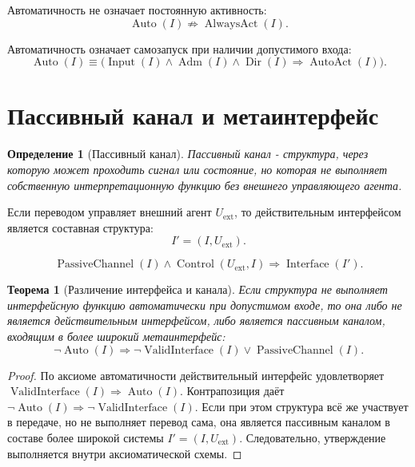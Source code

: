 \documentclass[12pt,a4paper]{article}
\newtheorem{definition}{Определение}
\newtheorem{theorem}{Теорема}
\DeclareMathOperator{\Valid}{ValidInterface}
\DeclareMathOperator{\Interface}{Interface}
\DeclareMathOperator{\Auto}{Auto}
\DeclareMathOperator{\AlwaysAct}{AlwaysAct}
\DeclareMathOperator{\Input}{Input}
\DeclareMathOperator{\Adm}{Adm}
\DeclareMathOperator{\Dir}{Dir}
\DeclareMathOperator{\AutoAct}{AutoAct}
\DeclareMathOperator{\PassiveChannel}{PassiveChannel}
\DeclareMathOperator{\Control}{Control}
\begin{document}
Автоматичность не означает постоянную активность:
\begin{equation}
\boxed{\Auto(I)\not\Rightarrow\AlwaysAct(I).}
\end{equation}

Автоматичность означает самозапуск при наличии допустимого входа:
\begin{equation}
\boxed{\Auto(I)\equiv\bigl(\Input(I)\land\Adm(I)\land\Dir(I)\Rightarrow\AutoAct(I)\bigr).}
\end{equation}

\section{Пассивный канал и метаинтерфейс}
\begin{definition}[Пассивный канал]
Пассивный канал - структура, через которую может проходить сигнал или состояние, но которая не выполняет собственную интерпретационную функцию без внешнего управляющего агента.
\end{definition}

Если переводом управляет внешний агент \(U_{\mathrm{ext}}\), то действительным интерфейсом является составная структура:
\begin{equation}
\boxed{I'=(I,U_{\mathrm{ext}}).}
\end{equation}

\begin{equation}
\boxed{\PassiveChannel(I)\land\Control(U_{\mathrm{ext}},I)\Rightarrow\Interface(I').}
\end{equation}

\begin{theorem}[Различение интерфейса и канала]
Если структура не выполняет интерфейсную функцию автоматически при допустимом входе, то она либо не является действительным интерфейсом, либо является пассивным каналом, входящим в более широкий метаинтерфейс:
\begin{equation}
\boxed{\neg\Auto(I)\Rightarrow \neg\Valid(I)\lor\PassiveChannel(I).}
\end{equation}
\end{theorem}

\begin{proof}
По аксиоме автоматичности действительный интерфейс удовлетворяет \(\Valid(I)\Rightarrow\Auto(I)\). Контрапозиция даёт \(\neg\Auto(I)\Rightarrow\neg\Valid(I)\). Если при этом структура всё же участвует в передаче, но не выполняет перевод сама, она является пассивным каналом в составе более широкой системы \(I'=(I,U_{\mathrm{ext}})\). Следовательно, утверждение выполняется внутри аксиоматической схемы.
\end{proof}
\end{document}
